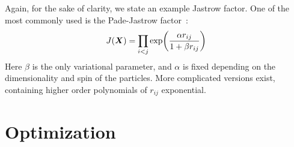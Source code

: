 \documentclass[Thesis.tex]{subfiles}
\begin{document}
Again, for the sake of clarity, we state an example Jastrow factor. One of the most
commonly used is the Pade-Jastrow factor~\cite{Drummond-Towler-Needs-2008}:
\begin{align}
    J(\bm{X}) = \prod_{i < j} \exp(\frac{\alpha r_{ij}}{1 + \beta r_{ij} } )
\end{align}
Here $\beta$ is the only variational parameter, and $\alpha$ is fixed depending on the
dimensionality and spin of the particles. More complicated versions exist, containing
higher order polynomials of $r_{ij}$ exponential.




\section{Optimization}
\end{document}
